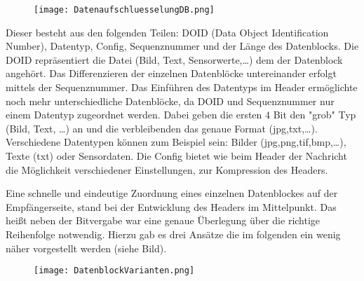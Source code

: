 \begin{figure}[H]
	\centering
	\texttt{[image: DatenaufschluesselungDB.png]}
\end{figure}

Dieser besteht aus den folgenden Teilen: DOID (Data Object Identification
Number), Datentyp, Config, Sequenznummer und der Länge des Datenblocks. Die DOID
repräsentiert die Datei (Bild, Text, Sensorwerte,\ldots) dem der Datenblock
angehört. Das Differenzieren der einzelnen Datenblöcke untereinander erfolgt
mittels der Sequenznummer. Das Einführen des Datentyps im Header ermöglichte
noch mehr unterschiedliche Datenblöcke, da DOID und Sequenznummer nur einem
Datentyp zugeordnet werden.
Dabei geben die ersten $4$ Bit den "grob" Typ (Bild, Text, \ldots) an und die
verbleibenden das genaue Format (jpg,txt,\ldots). Verschiedene Datentypen können
zum Beispiel sein: Bilder (jpg,png,tif,bmp,\ldots), Texte (txt) oder
Sensordaten. Die Config bietet wie beim Header der Nachricht die Möglichkeit
verschiedener Einstellungen, zur Kompression des Headers.

Eine schnelle und eindeutige Zuordnung eines einzelnen Datenblockes auf der
Empfängerseite, stand bei der Entwicklung des Headers im Mittelpunkt. Das heißt
neben der Bitvergabe war eine genaue Überlegung über die richtige Reihenfolge
notwendig. Hierzu gab es drei Ansätze die im folgenden ein wenig näher
vorgestellt werden (siehe Bild).

\begin{figure}[H]
	\centering
	\texttt{[image: DatenblockVarianten.png]}
\end{figure}

